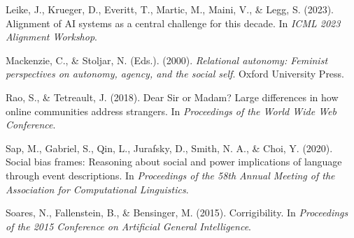 \documentclass[
]{article}
\begin{document}
Leike, J., Krueger, D., Everitt, T., Martic, M., Maini, V., \& Legg, S.
(2023). Alignment of AI systems as a central challenge for this decade.
In \emph{ICML 2023 Alignment Workshop}.

Mackenzie, C., \& Stoljar, N. (Eds.). (2000). \emph{Relational autonomy:
Feminist perspectives on autonomy, agency, and the social self}. Oxford
University Press.

Rao, S., \& Tetreault, J. (2018). Dear Sir or Madam? Large differences
in how online communities address strangers. In \emph{Proceedings of the
World Wide Web Conference}.

Sap, M., Gabriel, S., Qin, L., Jurafsky, D., Smith, N. A., \& Choi, Y.
(2020). Social bias frames: Reasoning about social and power
implications of language through event descriptions. In
\emph{Proceedings of the 58th Annual Meeting of the Association for
Computational Linguistics}.

Soares, N., Fallenstein, B., \& Bensinger, M. (2015). Corrigibility. In
\emph{Proceedings of the 2015 Conference on Artificial General
Intelligence}.
\end{document}
